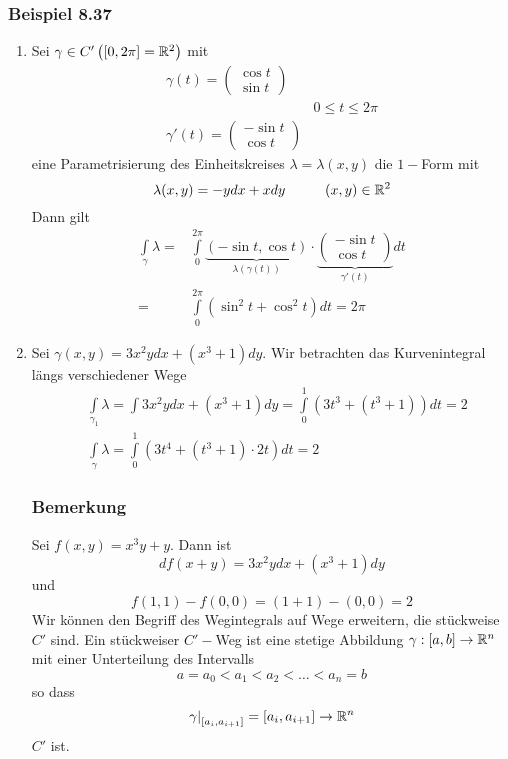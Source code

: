 \subsubsection*{Beispiel 8.37}
\begin{enumerate}
\item Sei $\gamma\in C'\left(\lbrack 0,2\pi\rbrack =\mathbb{R}^2\right)$ mit
\[\begin{array}{*{20}{c}}
{\gamma (t) = \left( {\begin{array}{*{20}{c}}
{\cos t}\\
{\sin t}
\end{array}} \right)}&{}\\
{}&{0 \le t \le 2\pi }\\
{\gamma '(t) = \left( {\begin{array}{*{20}{c}}
{ - \sin t}\\
{\cos t}
\end{array}} \right)}&{}
\end{array}\]
eine Parametrisierung des Einheitskreises $\lambda = \lambda (x,y)$ die $1-$Form mit \[\lambda (x,y)=-ydx+xdy\hspace{10mm}(x,y)\in\R^2\]
Dann gilt
\begin{align*}
\int\limits_\gamma  \lambda   = &\int\limits_0^{2\pi } {\underbrace {\left( { - \sin t,\cos t} \right)}_{\lambda (\gamma (t))} \cdot \underbrace {\left( {\begin{array}{*{20}{c}}
{ - \sin t}\\
{\cos t}
\end{array}} \right)}_{\gamma '(t)}dt} \\
= &\int\limits_0^{2\pi } {\left( {{{\sin }^2}t + {{\cos }^2}t} \right)dt}  = 2\pi
\end{align*}
\item Sei $\gamma (x,y)=3x^2ydx + \left( x^3+1\right)dy$. Wir betrachten das Kurvenintegral längs verschiedener Wege
\begin{align*}
&\int\limits_{{\gamma _1}} \lambda   = \int {3{x^2}ydx + \left( {{x^3} + 1} \right)dy}  = \int\limits_0^1 {\left( {3{t^3} + \left( {{t^3} + 1} \right)} \right)dt = 2}\\
&\int\limits_\gamma  \lambda   = \int\limits_0^1 {\left( {3{t^4} + \left( {{t^3} + 1} \right) \cdot 2t} \right)dt = 2}
\end{align*}
\subsubsection*{Bemerkung}
Sei $f(x,y)=x^3y+y$. Dann ist  \[df(x+y)=3x^2ydx+\left( x^3+1\right) dy\] und \[f(1,1)-f(0,0)=(1+1)-(0,0)=2\]
Wir können den Begriff des Wegintegrals auf Wege erweitern, die stückweise $C'$ sind. Ein stückweiser $C'-$Weg ist eine stetige Abbildung $\gamma :\lbrack a,b\rbrack\to\mathbb{R}^n$ mit einer Unterteilung des Intervalls
\[a=a_0 < a_1 < a_2 < \dots <a_n = b\]
so dass \[{\left. \gamma  \right|_{\left[ {{a_i},{a_{i + 1}}} \right]}} = \left[ {{a_i},{a_{i + 1}}} \right] \to \mathbb{R}^n \] $C'$ ist.\\


\end{enumerate}
